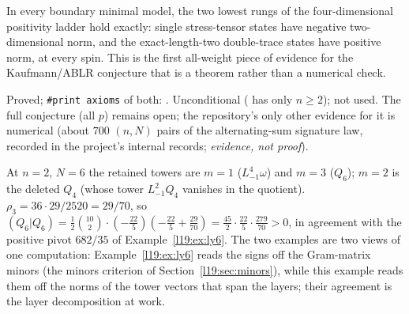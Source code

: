 \begin{physics}
In every boundary minimal model, the two lowest rungs of the four-dimensional positivity ladder hold
exactly: single stress-tensor states have negative two-dimensional norm, and the exact-length-two
double-trace states have positive norm, at every spin. This is the first all-weight piece of evidence for
the Kaufmann/ABLR conjecture that is a theorem rather than a numerical check.
\end{physics}

\begin{status}
Proved; \texttt{\#print axioms} of both: . Unconditional
(\allowbreak{} has only $n\ge2$);  not used. The full conjecture
(all $p$) remains open; the repository's only other evidence for it is numerical (about $700$ $(n,N)$ pairs of
the alternating-sum signature law, recorded in the project's internal records; \emph{evidence, not proof}).
\end{status}

\begin{example}\label{l19:ex:ly6b}
At $n=2$, $N=6$ the retained towers are $m=1$ ($L_{-1}^4\omega$) and $m=3$ ($Q_6$); $m=2$ is the deleted
$Q_4$ (whose tower $L_{-1}^2Q_4$ vanishes in the quotient). $\rho_3 = 36\cdot29/2520 = 29/70$, so
$(Q_6|Q_6) = \tfrac12\binom{10}{2}\cdot(-\tfrac{22}5)(-\tfrac{22}5+\tfrac{29}{70}) = \tfrac{45}2\cdot
\tfrac{22}{5}\cdot\tfrac{279}{70}>0$, in agreement with the positive pivot $682/35$ of
Example~\ref{l19:ex:ly6}. The two examples are two views of one computation: Example~\ref{l19:ex:ly6} reads
the signs off the Gram-matrix minors (the minors criterion of Section~\ref{l19:sec:minors}), while this example
reads them off the norms of the tower vectors that span the layers; their agreement is the layer decomposition
at work.
\end{example}

